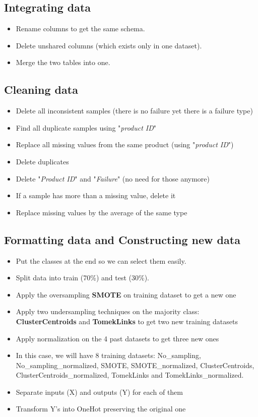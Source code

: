\documentclass[11pt, a4paper]{article}
\begin{document}
\begin{multicols}{2}
\subsection{Integrating data}

\begin{itemize}
	\item Rename columns to get the same schema.
	\item Delete unshared columns (which exists only in one dataset).
	\item Merge the two tables into one.
\end{itemize}

\subsection{Cleaning data}

\begin{itemize}
	\item Delete all inconsistent samples (there is no failure yet there is a failure type)
	\item Find all duplicate samples using "\textit{product ID}"
	\item Replace all missing values from the same product (using "\textit{product ID}")
	\item Delete duplicates
	\item Delete "\textit{Product ID}" and "\textit{Failure}" (no need for those anymore)
	\item If a sample has more than a missing value, delete it
	\item Replace missing values by the average of the same type
\end{itemize}

\subsection{Formatting data and Constructing new data}

\begin{itemize}
	\item Put the classes at the end so we can select them easily.
	\item Split data into train (70\%) and test (30\%).
	\item Apply the oversampling \textbf{SMOTE} on training dataset to get a new one
	\item Apply two undersampling techniques on the majority class: \textbf{ClusterCentroids} and \textbf{TomekLinks} to get two new training datasets
	\item Apply normalization on the 4 past datasets to get three new ones
	\item In this case, we will have 8 training datasets: No\_sampling, No\_sampling\_normalized, SMOTE, SMOTE\_normalized, ClusterCentroids, ClusterCentroids\_normalized, TomekLinks and TomekLinks\_normalized.
	\item Separate inputs (X) and outputs (Y) for each of them
	\item Transform Y's into OneHot preserving the original one
\end{itemize}



\end{multicols}
\end{document}
